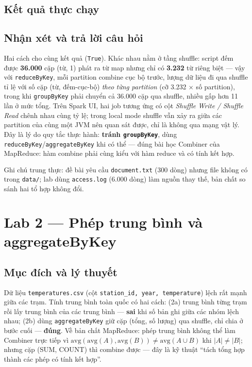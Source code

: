 \documentclass[12pt,a4paper,oneside]{article}
\begin{document}
\subsection{Kết quả thực chạy}



\subsection{Nhận xét và trả lời câu hỏi}

Hai cách cho cùng kết quả (\texttt{True}). Khác nhau nằm ở tầng shuffle: script đếm được \textbf{36.000} cặp (từ, 1) phát ra từ map nhưng chỉ có \textbf{3.232} từ riêng biệt --- vậy với \texttt{reduceByKey}, mỗi partition combine cục bộ trước, lượng dữ liệu đi qua shuffle tỉ lệ với số cặp (từ, đếm-cục-bộ) \emph{theo từng partition} (cỡ 3.232 $\times$ số partition), trong khi \texttt{groupByKey} phải chuyển cả 36.000 cặp qua shuffle, nhiều gấp hơn 11 lần ở mức tổng. Trên Spark UI, hai job tương ứng có cột \emph{Shuffle Write / Shuffle Read} chênh nhau cùng tỷ lệ; trong local mode shuffle vẫn xảy ra giữa các partition của cùng một JVM nên quan sát được, chỉ là không qua mạng vật lý. Đây là lý do quy tắc thực hành: \textbf{tránh \texttt{groupByKey}}, dùng \texttt{reduceByKey}/\texttt{aggregateByKey} khi có thể --- đúng bài học Combiner của MapReduce: hàm combine phải cùng kiểu với hàm reduce và có tính kết hợp.

Ghi chú trung thực: đề bài yêu cầu \texttt{document.txt} (300 dòng) nhưng file không có trong \texttt{data/}; lab dùng \texttt{access.log} (6.000 dòng) làm nguồn thay thế, bản chất so sánh hai tổ hợp không đổi.

\section{Lab 2 --- Phép trung bình và aggregateByKey}
\label{sec:lab2}

\subsection{Mục đích và lý thuyết}

Dữ liệu \texttt{temperatures.csv} (cột \texttt{station\_id, year, temperature}) lệch rất mạnh giữa các trạm. Tính trung bình toàn quốc có hai cách: (2a) trung bình từng trạm rồi lấy trung bình của các trung bình --- \textbf{sai} khi số bản ghi giữa các nhóm lệch nhau; (2b) dùng \texttt{aggregateByKey} giữ cặp (tổng, số lượng) qua shuffle, chỉ chia ở bước cuối --- \textbf{đúng}. Về bản chất MapReduce: phép trung bình không thể làm Combiner trực tiếp vì $\mathrm{avg}(\mathrm{avg}(A), \mathrm{avg}(B)) \neq \mathrm{avg}(A \cup B)$ khi $|A| \neq |B|$; nhưng cặp (SUM, COUNT) thì combine được --- đây là kỹ thuật ``tách tổng hợp thành các phép có tính kết hợp''.
\end{document}
